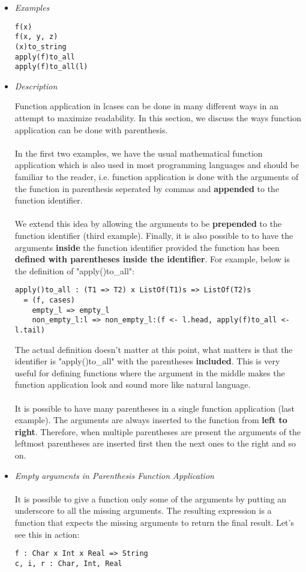 \documentclass{article}
\begin{document}
\begin{itemize}
\item \textit{Examples}

\begin{verbatim}
f(x)
f(x, y, z)
(x)to_string
apply(f)to_all
apply(f)to_all(l)
\end{verbatim}

\item \textit{Description}

Function application in lcases can be done in many different ways in an attempt to 
maximize readability. In this section, we discuss the ways function application can
be done with parenthesis.
\\\\
In the first two examples, we have the usual mathematical
function application which is also used in most programming languages and
should be familiar to the reader, i.e. function application is done with the 
arguments of the function in parenthesis seperated by commas and \textbf{appended}
to the function identifier.
\\\\
We extend this idea by allowing the arguments to be \textbf{prepended} to the
function identifier (third example). Finally, it is also possible to to have
the arguments \textbf{inside} the function identifier provided the function has
been \textbf{defined with parentheses inside the identifier}. For example,
below is the definition of "apply()to\_all":

\begin{verbatim}
apply()to_all : (T1 => T2) x ListOf(T1)s => ListOf(T2)s
  = (f, cases)
    empty_l => empty_l
    non_empty_l:l => non_empty_l:(f <- l.head, apply(f)to_all <- l.tail)
\end{verbatim}
The actual definition doesn't matter at this point, what matters is that the 
identifier is "apply()to\_all" with the parentheses \textbf{included}. This is very
useful for defining functions where the argument in the middle makes the function
application look and sound more like natural language.
\\\\
It is possible to have many parentheses in a single function application (last
example). The arguments are always inserted to the function from \textbf{left
to right}.  Therefore, when multiple parentheses are present the arguments of
the leftmost parentheses are inserted first then the next ones to the right and
so on.

\item \textit{Empty arguments in Parenthesis Function Application}
\\\\
It is possible to give a function only some of the arguments by putting an
underscore to all the missing arguments. The resulting expression is a function
that expects the missing arguments to return the final result. Let's see
this in action:
\begin{verbatim}
f : Char x Int x Real => String
c, i, r : Char, Int, Real


\end{verbatim}
\end{itemize}
\end{document}
